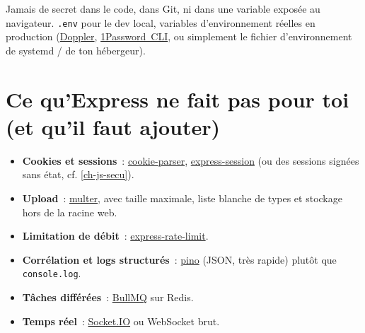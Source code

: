 \documentclass[12pt,a4paper,twoside,openright]{book}
\newcommand{\link}[2]{\href{#2}{#1}}
\begin{document}
Jamais de secret dans le code, dans Git, ni dans une variable expos\'ee au navigateur.
\verb|.env| pour le dev local, variables d'environnement r\'eelles en production
(\link{Doppler}{https://doppler.com/}, \link{1Password~CLI}{https://developer.1password.com/docs/cli/},
ou simplement le fichier d'environnement de systemd / de ton h\'ebergeur).

\section{Ce qu'Express ne fait pas pour toi (et qu'il faut ajouter)}

\begin{itemize}
  \item \textbf{Cookies et sessions}~: \link{cookie-parser}{https://github.com/pillarjs/cookie-parser},
        \link{express-session}{https://github.com/expressjs/session} (ou des sessions sign\'ees sans
        \'etat, cf. \cref{ch-js-secu}).
  \item \textbf{Upload}~: \link{multer}{https://github.com/expressjs/multer}, avec taille maximale,
        liste blanche de types et stockage hors de la racine web.
  \item \textbf{Limitation de d\'ebit}~: \link{express-rate-limit}{https://github.com/nickdesclos/express-rate-limit}.
  \item \textbf{Corr\'elation et logs structur\'es}~: \link{pino}{https://github.com/pinojs/pino}
        (JSON, tr\`es rapide) plut\^ot que \verb|console.log|.
  \item \textbf{T\^aches diff\'er\'ees}~: \link{BullMQ}{https://docs.bullmq.io/} sur Redis.
  \item \textbf{Temps r\'eel}~: \link{Socket.IO}{https://socket.io/fr/} ou WebSocket brut.
\end{itemize}

\end{document}
